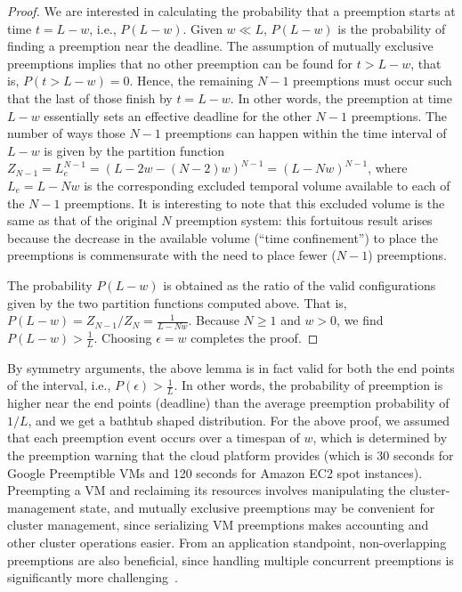 \begin{proof}
We are interested in calculating the probability that a preemption starts at time $t=L-w$, i.e., $P(L-w)$. Given $w \ll L$, $P(L-w)$ is the probability of finding a preemption near the deadline. The assumption of mutually exclusive preemptions implies that no other preemption can be found for $t > L - w$, that is, $P(t> L-w) = 0$. Hence, the remaining $N-1$ preemptions must occur such that the last of those finish by $t=L-w$. In other words, the preemption at time $L-w$ essentially sets an effective deadline for the other $N-1$ preemptions. The number of ways those $N-1$ preemptions can happen within the time interval of $L-w$ is given by the partition function $Z_{N-1} = L_e^{N-1}= (L-2w - (N-2)w)^{N-1} = (L - Nw)^{N-1}$, where $L_e = L - Nw$ is the corresponding excluded temporal volume available to each of the $N-1$ preemptions.
It is interesting to note that this excluded volume
is the same as that of the original $N$ preemption system: this fortuitous result arises because the decrease in the available volume (``time confinement'') to place the preemptions is commensurate with the need to place fewer ($N-1$) preemptions.

The probability $P(L-w)$ is obtained as the ratio of the valid configurations given by the two partition functions computed above.
That is, $P(L-w) = Z_{N-1}/ {Z_N} = \frac{1}{L - Nw}$. Because $N \geq 1$ and $w>0$, we find $P(L-w) > \frac{1}{L}$. Choosing $\epsilon = w$ completes the proof.
\end{proof}

By symmetry arguments, the above lemma is in fact valid for both the end points of the interval, i.e., $P(\epsilon) > \frac{1}{L}$.
In other words, the probability of preemption is higher near the end points (deadline) than the average preemption probability of $1/L$, and we get a bathtub shaped distribution.
For the above proof, we assumed that each preemption event occurs over a timespan of $w$, which is determined by the preemption warning that the cloud platform provides (which is 30 seconds for Google Preemptible VMs and 120 seconds for Amazon EC2 spot instances). 
Preempting a VM and reclaiming its resources involves manipulating the cluster-management state, and mutually exclusive preemptions may be convenient for cluster management, since serializing VM preemptions makes accounting and other cluster operations easier.
From an application standpoint, non-overlapping preemptions are also beneficial, since handling multiple concurrent preemptions is significantly more challenging~\cite{exosphere}. 



